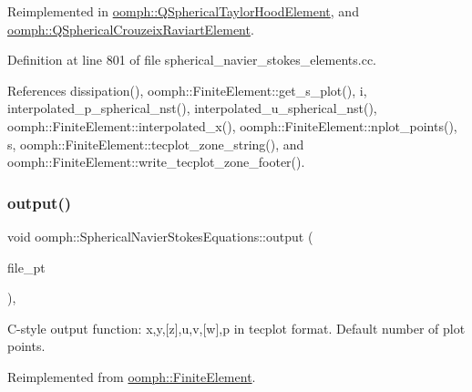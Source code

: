 Reimplemented in \hyperlink{classoomph_1_1QSphericalTaylorHoodElement_ac4e26ba768ccacbcd5144d34219690b0}{oomph\+::\+Q\+Spherical\+Taylor\+Hood\+Element}, and \hyperlink{classoomph_1_1QSphericalCrouzeixRaviartElement_a23d3c82c7dbb8c220b433d2836707136}{oomph\+::\+Q\+Spherical\+Crouzeix\+Raviart\+Element}.



Definition at line 801 of file spherical\+\_\+navier\+\_\+stokes\+\_\+elements.\+cc.



References dissipation(), oomph\+::\+Finite\+Element\+::get\+\_\+s\+\_\+plot(), i, interpolated\+\_\+p\+\_\+spherical\+\_\+nst(), interpolated\+\_\+u\+\_\+spherical\+\_\+nst(), oomph\+::\+Finite\+Element\+::interpolated\+\_\+x(), oomph\+::\+Finite\+Element\+::nplot\+\_\+points(), s, oomph\+::\+Finite\+Element\+::tecplot\+\_\+zone\+\_\+string(), and oomph\+::\+Finite\+Element\+::write\+\_\+tecplot\+\_\+zone\+\_\+footer().

\mbox{\label{classoomph_1_1SphericalNavierStokesEquations_a76ad2e32bc8d2efa6242e78ea66076ed}} 
\subsubsection{\texorpdfstring{output()}{output()}\hspace{0.1cm}{\footnotesize\ttfamily [3/4]}}
{\footnotesize\ttfamily void oomph\+::\+Spherical\+Navier\+Stokes\+Equations\+::output (\begin{DoxyParamCaption}\item[{F\+I\+LE $\ast$}]{file\+\_\+pt }\end{DoxyParamCaption})\hspace{0.3cm}{\ttfamily [inline]}, {\ttfamily [virtual]}}



C-\/style output function\+: x,y,\mbox{[}z\mbox{]},u,v,\mbox{[}w\mbox{]},p in tecplot format. Default number of plot points. 



Reimplemented from \hyperlink{classoomph_1_1FiniteElement_a72cddd09f8ddbee1a20a1ff404c6943e}{oomph\+::\+Finite\+Element}.



